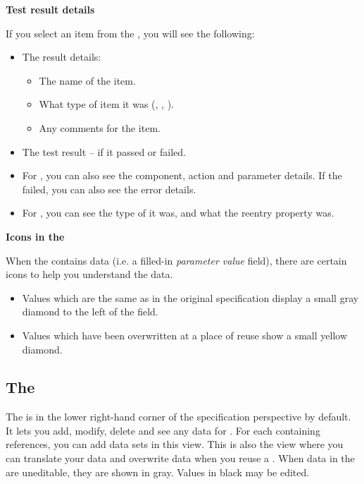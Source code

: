 \textbf{Test result details}

If you select an item from the \gdtestresultview{}, you will see the following:
\begin{itemize}
\item The result details:
\begin{itemize}
\item The name of the item.
\item What type of item it was (\gdsuite{}, \gdcase{}, \gdstep{}). 
\item Any comments for the item.
\end{itemize}
\item The test result -- if it passed or failed.
\item For \gdsteps{}, you can also see the component, action and parameter details. If the \gdstep{} failed, you can also see the error details. 
\item For \gdehandlers{}, you can see the type of \gdehandler{} it was, and what the reentry property was. 
\end{itemize}

 
\textbf{Icons in the \gdpropview{}}

When the \gdpropview{} contains data (i.e. a filled-in \emph{parameter value} field), there are certain icons to help you understand the data.  
\begin{itemize}
\item Values which are the same as in the original specification display 
a small gray diamond to the left of the field.
\item Values which have been overwritten at a place of reuse show a small 
yellow diamond. 
\end{itemize}


\subsection{The \gddatasetsview{}}
The \gddatasetsview{} is in the lower right-hand corner of the specification perspective by default. It lets you add, modify, delete and see any data for \gdcases{}. For each \gdcase{} containing references, you can add data sets in this view. This is also the view where you can translate your data and overwrite data when you reuse a \gdcase{}. 
 When data in the \gddatasetsview are uneditable, they are shown in gray. Values in black may be edited.

